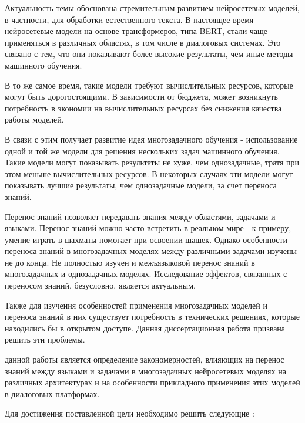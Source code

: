 {\actuality} 
Актуальность темы обоснована стремительным развитием нейросетевых моделей, в частности, для обработки естественного текста.
В настоящее время нейросетевые модели на основе трансформеров, типа BERT, стали чаще применяться в различных областях, в том числе в диалоговых системах. Это связано с тем, что они показывают более высокие результаты, чем иные методы машинного обучения. 

В то же самое время, такие модели требуют вычислительных ресурсов, которые могут быть дорогостоящими. В зависимости от бюджета, может возникнуть потребность в экономии на вычислительных ресурсах без снижения качества работы моделей.

В связи с этим получает развитие идея многозадачного обучения - использование одной и той же модели для решения нескольких задач машинного обучения. Такие модели могут показывать результаты не хуже, чем однозадачные, тратя при этом меньше вычислительных ресурсов. В некоторых случаях эти модели могут показывать лучшие результаты, чем однозадачные модели, за счет переноса знаний.

Перенос знаний позволяет передавать знания между областями, задачами и языками. Перенос знаний можно часто встретить в реальном мире - к примеру, умение играть в шахматы помогает при освоении шашек. Однако особенности переноса знаний в многозадачных моделях между различными задачами изучены не до конца. Не полностью изучен и межъязыковой перенос знаний в многозадачных и однозадачных моделях. Исследование эффектов, связанных с переносом знаний, безусловно, является актуальным.

Также для изучения особенностей применения многозадачных моделей и переноса знаний в них существует потребность в технических решениях, которые находились бы в открытом доступе. Данная диссертационная работа призвана решить эти проблемы.


{\aim} данной работы является определение закономерностей, влияющих на перенос знаний между языками и задачами в многозадачных нейросетевых моделях на различных архитектурах и на особенности прикладного применения этих моделей в диалоговых платформах.

Для достижения поставленной цели необходимо решить следующие {\tasks}: %

